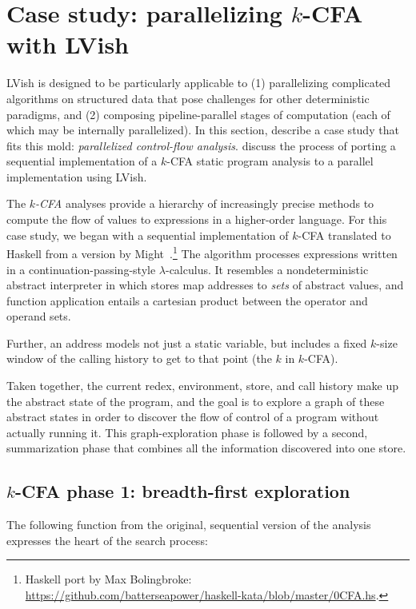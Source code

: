 \section{Case study: parallelizing $k$-CFA with LVish}\label{s:lvish-k-cfa}

LVish is designed to be particularly applicable to (1) parallelizing
complicated algorithms on structured data that pose challenges for
other deterministic paradigms, and (2) composing pipeline-parallel
stages of computation (each of which may be internally parallelized).
In this section,  describe a case study that fits this mold:
\emph{parallelized control-flow analysis}.   discuss the process of
porting a sequential implementation of a $k$-CFA static program
analysis to a parallel implementation using LVish.

The \emph{$k$-CFA} analyses provide a hierarchy of increasingly
precise methods to compute the flow of values to expressions in a
higher-order language.  For this case study, we began with a
sequential implementation of $k$-CFA translated to Haskell from a
version by Might~\cite{MightkCFABlog}.\footnote{Haskell port by Max
  Bolingbroke:
  \url{https://github.com/batterseapower/haskell-kata/blob/master/0CFA.hs}.}
The algorithm processes expressions written in a
continuation-passing-style $\lambda$-calculus.  It resembles a
nondeterministic abstract interpreter in which stores map addresses to
\emph{sets} of abstract values, and function application entails a
cartesian product between the operator and operand sets.

Further, an address models not just a static variable, but includes a
fixed $k$-size window of the calling history to get to that point (the
$k$ in $k$-CFA).

Taken together, the current redex, environment, store, and call
history make up the abstract state of the program, and the goal is to
explore a graph of these abstract states in order to discover the flow
of control of a program without actually running it.  This
graph-exploration phase is followed by a second, summarization phase
that combines all the information discovered into one store.

\subsection{$k$-CFA phase 1: breadth-first exploration}

The following function from the original, sequential version of the
analysis expresses the heart of the search process:

